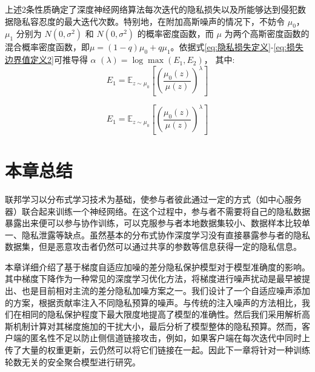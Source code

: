 上述2条性质确定了深度神经网络算法每次迭代的隐私损失以及所能够达到侵犯数据隐私容忍度的最大迭代次数。特别地，在附加高斯噪声的情况下，不妨令 $\mu_{0}$，$\mu_{1}$ 分别为 $N\left(0,\sigma^{2}\right)$ 和 $N\left(0,\sigma^{2}\right)$ 的概率密度函数，而 $\mu$ 为两个高斯密度函数的混合概率密度函数，即$\mu=(1-q) \mu_{0}+q \mu_{1}$。依据式\ref{eq:隐私损失定义}-\ref{eq:损失边界值定义2}可推导得 $\alpha$ $(\lambda)=\log \max \left(E_{1},E_{2}\right)$， 其中:
\begin{equation}\label{eq:隐私容忍1}
E_{1}=\mathbb{E}_{z \sim \mu_{0}}\left[\left(\frac{\mu_{0}(z)}{\mu(z)}\right)^{\lambda}\right]
\end{equation}

\begin{equation}\label{eq:隐私容忍2}
E_{1}=\mathbb{E}_{z \sim \mu_{0}}\left[\left(\frac{\mu_{0}(z)}{\mu(z)}\right)^{\lambda}\right]
\end{equation}

\section{本章总结}
联邦学习以分布式学习技术为基础，使参与者彼此通过一定的方式（如中心服务器）联合起来训练一个神经网络。在这个过程中，参与者不需要将自己的隐私数据暴露出来便可以参与协作训练，可以克服参与者本地数据集较小、数据样本比较单一、隐私泄露等缺点。虽然基本的分布式协作深度学习没有直接暴露参与者的隐私数据集，但是恶意攻击者仍然可以通过共享的参数等信息获得一定的隐私信息。 

本章详细介绍了基于梯度自适应加噪的差分隐私保护模型对于模型准确度的影响。其中梯度下降作为一种常见的深度学习优化方法，将梯度进行噪声扰动是最早被提出、也是目前相对主流的差分隐私加噪方案之一。我们设计了一个自适应噪声添加的方案，根据贡献率注入不同隐私预算的噪声。与传统的注入噪声的方法相比，我们在相同的隐私保护程度下最大限度地提高了模型的准确性。然后我们采用解析高斯机制计算对其梯度施加的干扰大小，最后分析了模型整体的隐私预算。然而，客户端的匿名性不足以防止侧信道链接攻击，例如，如果客户端在每次迭代中同时上传了大量的权重更新，云仍然可以将它们链接在一起。因此下一章将针对一种训练轮数无关的安全聚合模型进行研究。

